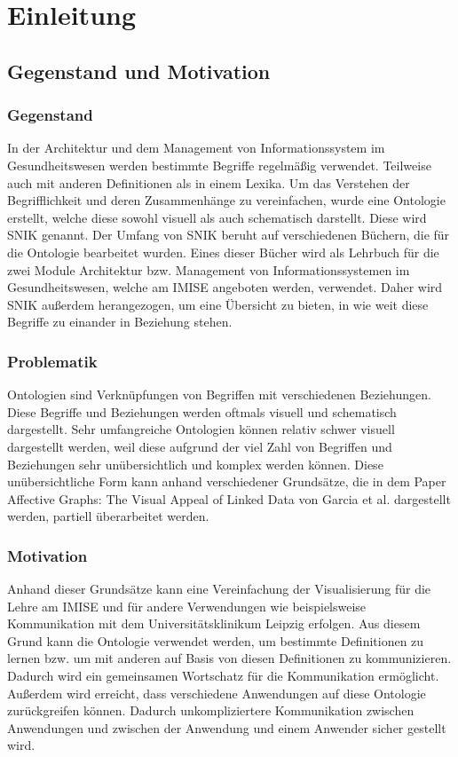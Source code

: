 
	\chapter{Einleitung}
	\label{ch:einleitung}
	\section{Gegenstand und Motivation}
	\label{sec:gegenstand_und_motivation}
	\subsection{Gegenstand}
	\label{subsec:gegenstand}
		In der Architektur und dem Management von Informationssystem im Gesundheitswesen werden bestimmte Begriffe regelmäßig verwendet. Teilweise auch mit anderen Definitionen als in einem Lexika. Um das Verstehen der Begrifflichkeit und deren Zusammenhänge zu vereinfachen, wurde eine Ontologie erstellt, welche diese sowohl visuell als auch schematisch darstellt. Diese wird \ac{SNIK} genannt. 
		Der Umfang von \ac{SNIK} beruht auf verschiedenen Büchern, die für die Ontologie bearbeitet wurden. Eines dieser Bücher wird als Lehrbuch für die zwei Module Architektur bzw. Management von Informationssystemen im Gesundheitswesen, welche am \ac{IMISE} angeboten werden, verwendet. Daher wird \ac{SNIK} außerdem herangezogen, um eine Übersicht zu bieten, in wie weit diese Begriffe zu einander in Beziehung stehen.
		
	\subsection{Problematik}
	\label{subsec:problematik}
		Ontologien sind Verknüpfungen von Begriffen mit verschiedenen Beziehungen. Diese Begriffe und Beziehungen werden oftmals visuell und schematisch dargestellt. Sehr umfangreiche Ontologien können relativ schwer visuell dargestellt werden, weil diese aufgrund der viel Zahl von Begriffen und Beziehungen sehr unübersichtlich und komplex werden können. Diese unübersichtliche Form kann anhand verschiedener Grundsätze, die in dem Paper \glqq Affective Graphs: The Visual Appeal of Linked Data\grqq{} von Garcia et al. dargestellt werden, partiell überarbeitet werden.
	\subsection{Motivation}
	\label{subsec:motivation}
		Anhand dieser Grundsätze kann eine Vereinfachung der Visualisierung für die Lehre am \ac{IMISE} und für andere Verwendungen wie beispielsweise Kommunikation mit dem Universitätsklinikum Leipzig erfolgen. Aus diesem Grund kann die Ontologie verwendet werden, um bestimmte Definitionen zu lernen bzw. um mit anderen auf Basis von diesen Definitionen zu kommunizieren. Dadurch wird ein gemeinsamen Wortschatz für die Kommunikation ermöglicht. Außerdem wird erreicht, dass verschiedene Anwendungen auf diese Ontologie zurückgreifen können. Dadurch unkompliziertere Kommunikation zwischen Anwendungen und zwischen der Anwendung und einem Anwender sicher gestellt wird.
		
